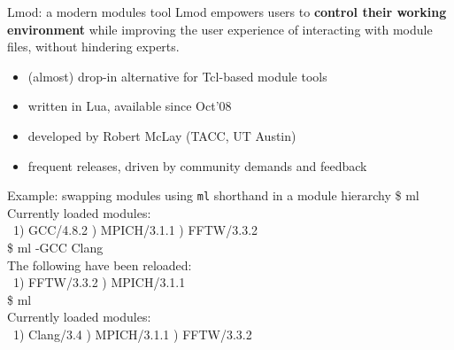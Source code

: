 \documentclass[10pt,xcolor={usenames,dvipsnames}]{beamer}
\begin{document}
\begin{frame}{Lmod: a modern modules tool}
    Lmod empowers users to \textbf{control their working environment} while improving the user
    experience of interacting with module files, without hindering experts.
    \begin{itemize}
        \item \small{(almost)} drop-in alternative for Tcl-based module tools
        \item written in Lua, available since Oct'08
        \item developed by Robert McLay (TACC, UT Austin)
        \item frequent releases, driven by community demands and feedback
    \end{itemize}
    \begin{minipage}{0.9\textwidth}
    \begin{exampleblock}{Example: swapping modules using \texttt{ml} shorthand in a module hierarchy}
        \ttfamily
        \$ ml\\
        Currently loaded modules:\\
        ~1) GCC/4.8.2 ) MPICH/3.1.1 ) FFTW/3.3.2\\
        \$ ml -GCC Clang\\
        The following have been reloaded:\\
        ~1) FFTW/3.3.2 ) MPICH/3.1.1\\
        \$ ml\\
        Currently loaded modules:\\
        ~1) Clang/3.4 ) MPICH/3.1.1 ) FFTW/3.3.2
    \end{exampleblock}
    \end{minipage}
\end{frame}

\end{document}
